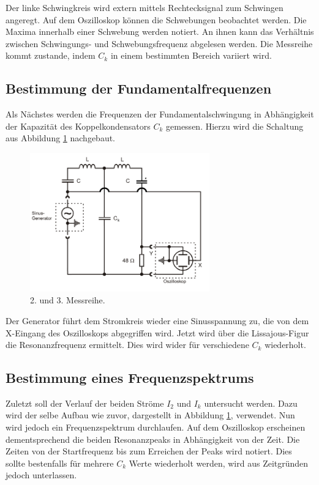 Der linke Schwingkreis wird extern mittels Rechtecksignal zum Schwingen angeregt.
Auf dem Oszilloskop können die Schwebungen beobachtet werden.
Die Maxima innerhalb einer Schwebung werden notiert.
An ihnen kann das Verhältnis zwischen Schwingungs- und Schwebungsfrequenz abgelesen werden.
Die Messreihe kommt zustande, indem $C_k$ in einem bestimmten Bereich variiert wird.\\
\subsection{Bestimmung der Fundamentalfrequenzen}
\label{sec:d2}
Als Nächstes werden die Frequenzen der Fundamentalschwingung in Abhängigkeit der Kapazität des Koppelkondensators $C_k$ gemessen.
Hierzu wird die Schaltung aus Abbildung \ref{fig:5} nachgebaut.

\begin{figure}[H]
  \centering
  \includegraphics[height=6cm]{b.png}
  \caption{2. und 3. Messreihe.}
  \label{fig:5}
\end{figure}

Der Generator führt dem Stromkreis wieder eine Sinusspannung zu, die von dem X-Eingang des Oszilloskops abgegriffen wird.
Jetzt wird über die Lissajous-Figur die Resonanzfrequenz ermittelt.
Dies wird wider für verschiedene $C_k$ wiederholt.\\
\subsection{Bestimmung eines Frequenzspektrums}
\label{sec:d3}
Zuletzt soll der Verlauf der beiden Ströme $I_2$ und $I_k$ untersucht werden.
Dazu wird der selbe Aufbau wie zuvor, dargestellt in Abbildung \ref{fig:5}, verwendet.
Nun wird jedoch ein Frequenzspektrum durchlaufen.
Auf dem Oszilloskop erscheinen dementsprechend die beiden Resonanzpeaks in Abhängigkeit von der Zeit.
Die Zeiten von der Startfrequenz bis zum Erreichen der Peaks wird notiert.
Dies sollte bestenfalls für mehrere $C_k$ Werte wiederholt werden, wird aus Zeitgründen jedoch unterlassen.
